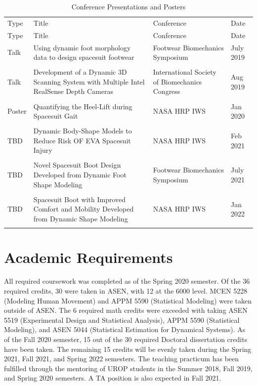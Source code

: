 \documentclass[defaultstyle,11pt]{comps}
\begin{document}
\hypertarget{tbl:conf}{}
\begin{longtable}[]{@{}
  >{\raggedright\arraybackslash}p{}
  >{\raggedright\arraybackslash}p{}
  >{\raggedright\arraybackslash}p{}
  >{\raggedright\arraybackslash}p{}@{}}
\caption{\label{tbl:conf}Conference Presentations and Posters}\tabularnewline
\toprule
Type & Title & Conference & Date \\ \addlinespace
\midrule
\endfirsthead
\toprule
Type & Title & Conference & Date \\ \addlinespace
\midrule
\endhead
Talk & Using dynamic foot morphology data to design spacesuit footwear & Footwear Biomechanics Symposium & July 2019 \\ \addlinespace
& & & \\ \addlinespace
Talk & Development of a Dynamic 3D Scanning System with Multiple Intel RealSense Depth Cameras & International Society of Biomechanics Congress & Aug 2019 \\ \addlinespace
& & & \\ \addlinespace
Poster & Quantifying the Heel-Lift during Spacesuit Gait & NASA HRP IWS & Jan 2020 \\ \addlinespace
& & & \\ \addlinespace
TBD & Dynamic Body-Shape Models to Reduce Risk OF EVA Spacesuit Injury & NASA HRP IWS & Feb 2021 \\ \addlinespace
& & & \\ \addlinespace
TBD & Novel Spacesuit Boot Design Developed from Dynamic Foot Shape Modeling & Footwear Biomechanics Symposium & July 2021 \\ \addlinespace
& & & \\ \addlinespace
TBD & Spacesuit Boot with Improved Comfort and Mobility Developed from Dynamic Shape Modeling & NASA HRP IWS & Jan 2022 \\ \addlinespace
\bottomrule
\end{longtable}

\hypertarget{academic-requirements}{%
\section{Academic Requirements}\label{academic-requirements}}

All required coursework was completed as of the Spring 2020 semester. Of the 36 required credits, 30 were taken in ASEN, with 12 at the 6000 level. MCEN 5228 (Modeling Human Movement) and APPM 5590 (Statistical Modeling) were taken outside of ASEN. The 6 required math credits were exceeded with taking ASEN 5519 (Experimental Design and Statistical Analysis), APPM 5590 (Statistical Modeling), and ASEN 5044 (Statistical Estimation for Dynamical Systems). As of the Fall 2020 semester, 15 out of the 30 required Doctoral dissertation credits have been taken. The remaining 15 credits will be evenly taken during the Spring 2021, Fall 2021, and Spring 2022 semesters. The teaching practicum has been fulfilled through the mentoring of UROP students in the Summer 2018, Fall 2019, and Spring 2020 semesters. A TA position is also expected in Fall 2021.
\end{document}
